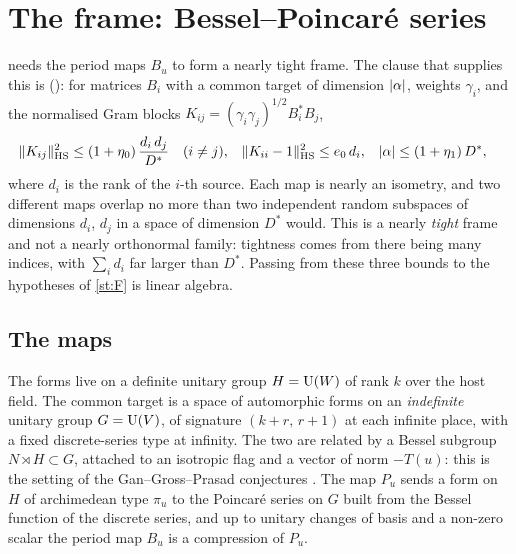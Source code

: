\section{The frame: Bessel--Poincar\'e series}\label{sec:frame}

 needs the period maps $B_u$ to form a nearly tight frame. The clause that supplies
this is \lvS{} (): for matrices $B_i$ with a common target of dimension
$\lvert \alpha\rvert$, weights $\gamma_i$, and the normalised Gram blocks
$K_{ij}=(\gamma_i\gamma_j)^{1/2}B_i^*B_j$,
\begin{align*}
\lVert K_{ij}\rVert_{\mathrm{HS}}^2&\le(1+\eta_0)\,\frac{d_i\,d_j}{D^*}\quad(i\ne j),&
\lVert K_{ii}-1\rVert_{\mathrm{HS}}^2&\le e_0\,d_i,&
\lvert \alpha\rvert&\le(1+\eta_1)\,D^*,
\end{align*}
where $d_i$ is the rank of the $i$-th source. Each map is nearly an isometry, and two different
maps overlap no more than two independent random subspaces of dimensions $d_i$, $d_j$ in a
space of dimension $D^*$ would. This is a nearly \emph{tight} frame and not a nearly
orthonormal family: tightness comes from there being many indices, with $\sum_id_i$ far larger
than $D^*$. Passing from these three bounds to the hypotheses of \cref{st:F} is linear algebra.

\subsection{The maps}
The forms live on a definite unitary group $H=\mathrm{U}(W)$ of rank $k$ over the host field. The
common target is a space of automorphic forms on an \emph{indefinite} unitary group
$G=\mathrm{U}(V)$, of signature $(k+r,\,r+1)$ at each infinite place, with a fixed discrete-series type at
infinity. The two are related by a Bessel subgroup $N\rtimes H\subset G$, attached to an
isotropic flag and a vector of norm $-T(u)$: this is the setting of the Gan--Gross--Prasad
conjectures \cite{ggp2012}. The map $P_u$ sends a form on $H$ of archimedean type $\pi_u$ to
the Poincar\'e series on $G$ built from the Bessel function of the discrete series, and up to
unitary changes of basis and a non-zero scalar the period map $B_u$ is a compression of $P_u$.


